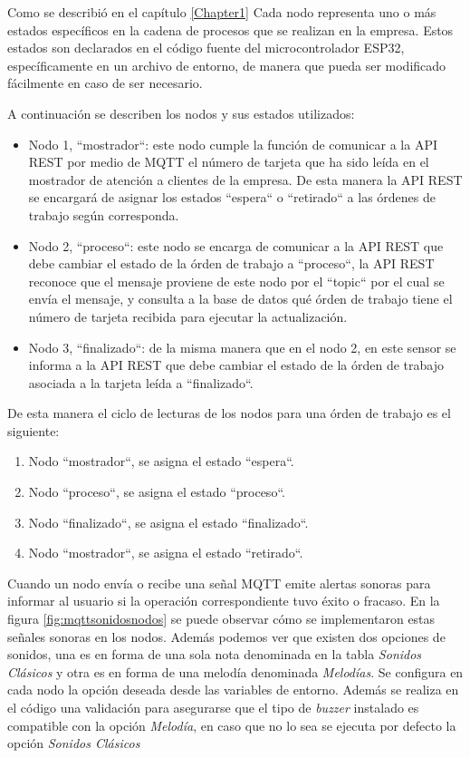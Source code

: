 Como se describió en el capítulo \ref{Chapter1} Cada nodo representa uno o más estados específicos en la cadena de procesos que se realizan en la empresa. Estos estados son declarados en el código fuente del microcontrolador ESP32, específicamente en un archivo de entorno, de manera que pueda ser modificado fácilmente en caso de ser necesario.

A continuación se describen los nodos y sus estados utilizados:

\begin{itemize}
\item Nodo 1, ``mostrador``: este nodo cumple la función de comunicar a la API REST por medio de MQTT el número de tarjeta que ha sido leída en el mostrador de atención a clientes de la empresa. De esta manera la API REST se encargará de asignar los estados ``espera`` o ``retirado`` a las órdenes de trabajo según corresponda.

\item Nodo 2, ``proceso``: este nodo se encarga de comunicar a la API REST que debe cambiar el estado de la órden de trabajo a ``proceso``, la API REST reconoce que el mensaje proviene de este nodo por el ``topic`` por el cual se envía el mensaje, y consulta a la base de datos qué órden de trabajo tiene el número de tarjeta recibida para ejecutar la actualización.

\item Nodo 3, ``finalizado``: de la misma manera que en el nodo 2, en este sensor se informa a la API REST que debe cambiar el estado de la órden de trabajo asociada a la tarjeta leída a ``finalizado``.
\end{itemize}

De esta manera el ciclo de lecturas de los nodos para una órden de trabajo es el siguiente: 

\begin{enumerate}
\item Nodo ``mostrador``, se asigna el estado ``espera``.
\item Nodo ``proceso``, se asigna el estado ``proceso``.
\item Nodo ``finalizado``, se asigna el estado ``finalizado``.
\item Nodo ``mostrador``, se asigna el estado ``retirado``.
\end{enumerate}

Cuando un nodo envía o recibe una señal MQTT emite alertas sonoras para informar al usuario si la operación correspondiente tuvo éxito o fracaso. En la figura \ref{fig:mqttsonidosnodos} se puede observar cómo se implementaron estas señales sonoras en los nodos. Además podemos ver que existen dos opciones de sonidos, una es en forma de una sola nota denominada en la tabla \textit{Sonidos Clásicos} y otra es en forma de una melodía denominada \textit{Melodías}. Se configura en cada nodo la opción deseada desde las variables de entorno. Además se realiza en el código una validación para asegurarse que el tipo de \textit{buzzer} instalado es compatible con la opción \textit{Melodía}, en caso que no lo sea se ejecuta por defecto la opción \textit{Sonidos Clásicos}

